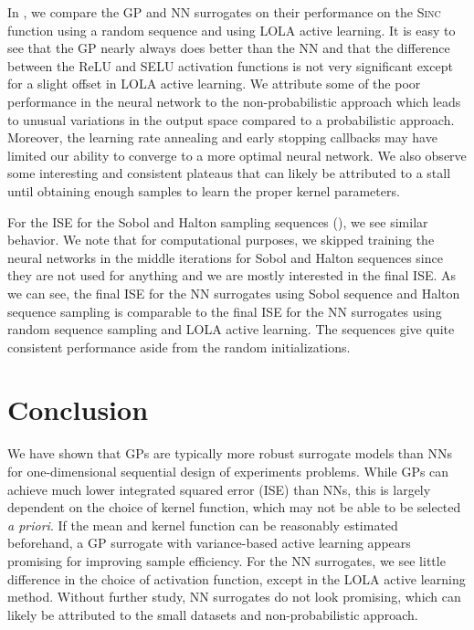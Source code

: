 \documentclass[conference]{IEEEtran}
\begin{document}
	In , we compare the GP and NN surrogates on their performance on the \textsc{Sinc} function using a random sequence and using LOLA active learning. It is easy to see that the GP nearly always does better than the NN and that the difference between the ReLU and SELU activation functions is not very significant except for a slight offset in LOLA active learning. We attribute some of the poor performance in the neural network to the non-probabilistic approach which leads to unusual variations in the output space compared to a probabilistic approach. Moreover, the learning rate annealing and early stopping callbacks may have limited our ability to converge to a more optimal neural network. We also observe some interesting and consistent plateaus that can likely be attributed to a stall until obtaining enough samples to learn the proper kernel parameters.
	
	For the ISE for the Sobol and Halton sampling sequences (), we see similar behavior. We note that for computational purposes, we skipped training the neural networks in the middle iterations for Sobol and Halton sequences since they are not used for anything and we are mostly interested in the final ISE. As we can see, the final ISE for the NN surrogates using Sobol sequence and Halton sequence sampling is comparable to the final ISE for the NN surrogates using random sequence sampling and LOLA active learning. The sequences give quite consistent performance aside from the random initializations.
	
	\section{Conclusion}
	\label{sec:conclusion}
	
	We have shown that GPs are typically more robust surrogate models than NNs for one-dimensional sequential design of experiments problems. While GPs can achieve much lower integrated squared error (ISE) than NNs, this is largely dependent on the choice of kernel function, which may not be able to be selected \textit{a priori}. If the mean and kernel function can be reasonably estimated beforehand, a GP surrogate with variance-based active learning appears promising for improving sample efficiency. For the NN surrogates, we see little difference in the choice of activation function, except in the LOLA active learning method. Without further study, NN surrogates do not look promising, which can likely be attributed to the small datasets and non-probabilistic approach.
	
\end{document}
